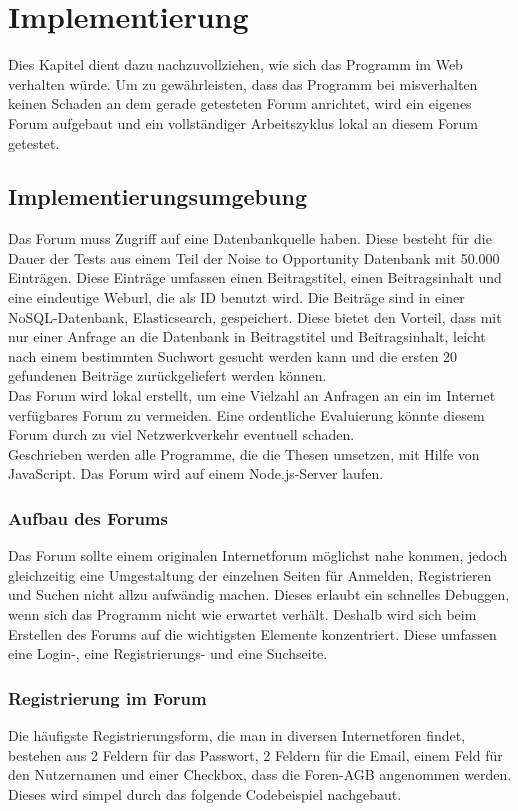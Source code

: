 \section{Implementierung}
Dies Kapitel dient dazu nachzuvollziehen, wie sich das Programm im Web verhalten würde. Um zu gewährleisten, dass das Programm bei misverhalten keinen Schaden an dem gerade getesteten Forum anrichtet, wird ein eigenes Forum aufgebaut und ein vollständiger Arbeitszyklus lokal an diesem Forum getestet.

\subsection{Implementierungsumgebung}
Das Forum muss Zugriff auf eine Datenbankquelle haben. Diese besteht für die Dauer der Tests aus einem Teil der Noise to Opportunity Datenbank mit 50.000 Einträgen. Diese Einträge umfassen einen Beitragstitel, einen Beitragsinhalt und eine eindeutige Weburl, die als ID benutzt wird. Die Beiträge sind in einer NoSQL-Datenbank, Elasticsearch, gespeichert. Diese bietet den Vorteil, dass mit nur einer Anfrage an die Datenbank in Beitragstitel und Beitragsinhalt, leicht nach einem bestimmten Suchwort gesucht werden kann und die ersten 20 gefundenen Beiträge zurückgeliefert werden können.\\
Das Forum wird lokal erstellt, um eine Vielzahl an Anfragen an ein im Internet verfügbares Forum zu vermeiden. Eine ordentliche Evaluierung könnte diesem Forum durch zu viel Netzwerkverkehr eventuell schaden.\\
Geschrieben werden alle Programme, die die Thesen umsetzen, mit Hilfe von JavaScript. Das Forum wird auf einem Node.js-Server laufen. 

\subsubsection{Aufbau des Forums}
Das Forum sollte einem originalen Internetforum möglichst nahe kommen, jedoch gleichzeitig eine Umgestaltung der einzelnen Seiten für Anmelden, Registrieren und Suchen nicht allzu aufwändig machen. Dieses erlaubt ein schnelles Debuggen, wenn sich das Programm nicht wie erwartet verhält. Deshalb wird sich beim Erstellen des Forums auf die wichtigsten Elemente konzentriert. Diese umfassen eine Login-, eine Registrierungs- und eine Suchseite.

\subsubsection{Registrierung im Forum}
Die häufigste Registrierungsform, die man in diversen Internetforen findet, bestehen aus 2 Feldern für das Passwort, 2 Feldern für die Email, einem Feld für den Nutzernamen und einer Checkbox, dass die Foren-AGB angenommen werden. Dieses wird simpel durch das folgende Codebeispiel nachgebaut.

